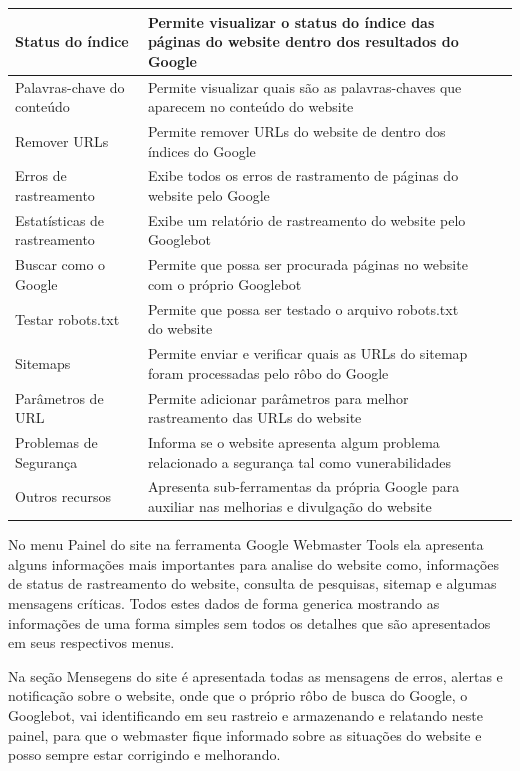 \documentclass[
	12pt,				%
	openright,			%
	twoside,			%
	a4paper,			%
	english,			%
	french,				%
	spanish,			%
	brazil				%
	]{abntex2}
\begin{document}
\begin{table}[htb]
\begin{center}
\begin{tabular}{p{2.6cm}|p{6.0cm}|p{2.25cm}|p{3.40cm}}
    \hline
    Status do índice & Permite visualizar o status do índice das páginas do website dentro dos resultados do Google \\
    \hline
    Palavras-chave do conteúdo & Permite visualizar quais são as palavras-chaves que aparecem no conteúdo do website \\
    \hline
    Remover URLs & Permite remover URLs do website de dentro dos índices do Google \\
    \hline
    Erros de rastreamento & Exibe todos os erros de rastramento de páginas do website pelo Google \\
    \hline
    Estatísticas de rastreamento & Exibe um relatório de rastreamento do website pelo Googlebot \\
    \hline
    Buscar como o Google & Permite que possa ser procurada páginas no website com o próprio Googlebot \\
    \hline
    Testar robots.txt & Permite que possa ser testado o arquivo robots.txt do website \\
    \hline
    Sitemaps & Permite enviar e verificar quais as URLs do sitemap foram processadas pelo rôbo do Google \\
    \hline
    Parâmetros de URL & Permite adicionar parâmetros para melhor rastreamento das URLs do website \\
    \hline
    Problemas de Segurança & Informa se o website apresenta algum problema relacionado a segurança tal como vunerabilidades \\
    \hline
    Outros recursos & Apresenta sub-ferramentas da própria Google para auxiliar nas melhorias e divulgação do website \\
\end{tabular}
\end{center}
\end{table}

No menu Painel do site na ferramenta Google Webmaster Tools ela apresenta alguns informações mais importantes para analise do website como,  informações de status de rastreamento do website, consulta de pesquisas, sitemap e algumas mensagens críticas. Todos estes dados de forma generica mostrando as informações de uma forma simples sem todos os detalhes que são apresentados em seus respectivos menus.

Na seção Mensegens do site é apresentada todas as mensagens de erros, alertas e notificação sobre o website, onde que o próprio rôbo de busca do Google, o Googlebot, vai identificando em seu rastreio e armazenando e relatando neste painel, para que o webmaster fique informado sobre as situações do website e posso sempre estar corrigindo e melhorando.
\end{document}
